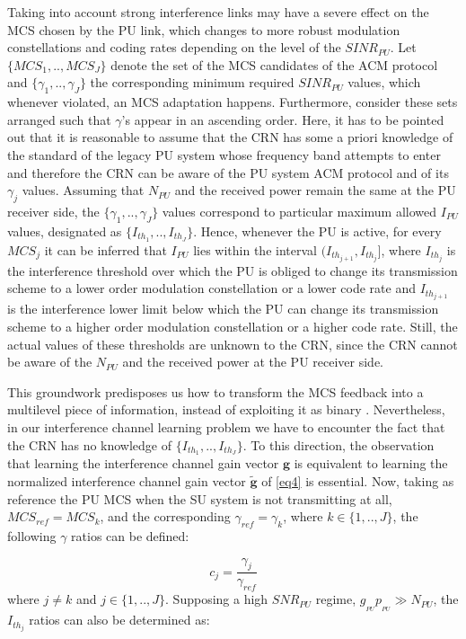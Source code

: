 \documentclass[journal]{IEEEtran}
\begin{document}
Taking into account strong interference links may have a severe effect on the MCS chosen by the PU link, which changes to more robust modulation constellations and coding rates depending on the level of the $SINR_{PU}$. Let $\{MCS_{1},..,MCS_{J}\}$ denote the set of the MCS candidates of the ACM protocol and $\{\gamma_{1},..,\gamma_{J}\}$ the corresponding minimum required $SINR_{PU}$ values, which whenever violated, an MCS adaptation happens. Furthermore, consider these sets arranged such that $\gamma$'s appear in an ascending order. Here, it has to be pointed out that it is reasonable to assume that the CRN has some a priori knowledge of the standard of the legacy PU system whose frequency band attempts to enter and therefore the CRN can be aware of the PU system ACM protocol and of its $\gamma_{j}$ values. Assuming that $N_{PU}$ and the received power remain the same at the PU receiver side, the $\{\gamma_{1},..,\gamma_{J}\}$ values correspond to particular maximum allowed $I_{PU}$ values, designated as $\{I_{th_{1}},..,I_{th_{J}}\}$. Hence, whenever the PU is active, for every $MCS_{j}$ it can be inferred that $I_{PU}$ lies within the interval $(I_{th_{j+1}},I_{th_{j}}]$, where $I_{th_{j}}$ is the interference threshold over which the PU is obliged to change its transmission scheme to a lower order modulation constellation or a lower code rate and $I_{th_{j+1}}$ is the interference lower limit below which the PU can change its transmission scheme to a higher order modulation constellation or a higher code rate. Still, the actual values of these thresholds are unknown to the CRN, since the CRN cannot be aware of the $N_{PU}$ and the received power at the PU receiver side.

This groundwork predisposes us how to transform the MCS feedback into a multilevel piece of information, instead of exploiting it as binary \cite{biban80}. Nevertheless, in our interference channel learning problem we have to encounter the fact that the CRN has no knowledge of $\{I_{th_{1}},..,I_{th_{J}}\}$. To this direction, the observation that learning the interference channel gain vector $\mathbf{g}$ is equivalent to learning the normalized interference channel gain vector $\mathbf{\tilde{g}}$ of \eqref{eq4} is essential. Now, taking as reference the PU MCS when the SU system is not transmitting at all, $MCS_{ref}=MCS_{k}$, and the corresponding $\gamma_{ref}=\gamma_{k}$, where $k\in \{1,..,J\}$, the following $\gamma$ ratios can be defined:

\begin{equation}
c_{j}=\frac{\gamma_{j}}{\gamma_{ref}}
\label{eq6}
\end{equation}
where $j\neq k$ and $j\in \{1,..,J\}$. Supposing a high $SNR_{PU}$ regime, $g_{_{PU}}p_{_{PU}}\gg N_{PU}$, the $I_{th_{j}}$ ratios can also be determined as:
\end{document}
